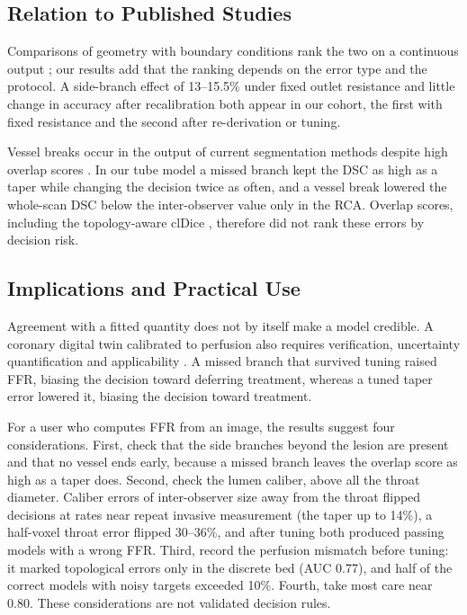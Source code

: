 \documentclass[journal,twoside,web]{ieeecolor}
\begin{document}
\subsection{Relation to Published Studies}
Comparisons of geometry with boundary conditions rank the two on a continuous output \cite{sankaran2016,tanade2022,korte2023};
our results add that the ranking depends on the error type and the protocol. A side-branch effect of 13--15.5\% under
fixed outlet resistance \cite{gamage2022} and little change in accuracy after recalibration \cite{gosling2020} both
appear in our cohort, the first with fixed resistance and the second after re-derivation or tuning.

Vessel breaks occur in the output of current segmentation methods despite high overlap scores \cite{bransby2026}.
In our tube model a missed branch kept the DSC as high as a taper while changing the decision twice as often, and a vessel break lowered the whole-scan DSC below the inter-observer value only in the RCA. Overlap scores, including the topology-aware clDice \cite{shit2021}, therefore did not rank these errors by decision risk.

\subsection{Implications and Practical Use}
Agreement with a fitted quantity does not by itself make a model credible. A coronary digital twin calibrated to perfusion also requires verification,
uncertainty quantification and applicability \cite{viceconti2025}. A missed branch that survived tuning raised FFR, biasing the decision toward
deferring treatment, whereas a tuned taper error lowered it, biasing the decision toward treatment.

For a user who computes FFR from an image, the results suggest four considerations. First, check that the side branches
beyond the lesion are present and that no vessel ends early, because a missed branch leaves the overlap score as high as a taper does.
Second, check the lumen caliber, above all the throat diameter. Caliber errors of inter-observer size away from the throat flipped decisions at rates near repeat invasive measurement (the taper up to 14\%), a half-voxel throat error flipped 30--36\%, and after tuning both produced passing models with a wrong FFR. Third, record the perfusion mismatch before tuning: it marked topological errors only in the discrete bed (AUC 0.77), and half of the correct models with noisy targets exceeded 10\%. Fourth, take most care near 0.80. These considerations are not validated decision rules.
\end{document}
